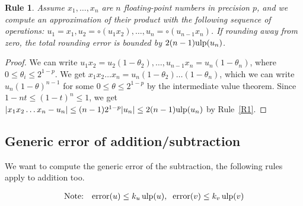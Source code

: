 \documentclass[12pt]{amsart}
\def\ulp{{\rm ulp}}
\DeclareMathOperator{\error}{error}
\newtheorem{Rule}{Rule}
\begin{document}
\begin{Rule} \label{R11}
Assume $x_1, \ldots, x_n$ are $n$ floating-point numbers in precision $p$,
and we compute an approximation of their product with the following sequence
of operations: $u_1 = x_1, u_2 = \circ(u_1 x_2), \ldots, u_n = \circ(u_{n-1}
x_n)$. If rounding away from zero, the total rounding error is bounded by
$2(n-1) \ulp(u_n)$.
\end{Rule}
\begin{proof}
We can write $u_1 x_2 = u_2 (1 - \theta_2), \ldots, u_{n-1} x_n = u_n
(1 - \theta_n)$, where $0 \leq \theta_i \leq 2^{1-p}$.
We get $x_1 x_2 \ldots x_n = u_n (1 - \theta_2) \ldots (1 - \theta_n)$,
which we can write $u_n (1-\theta)^{n-1}$ for some $0 \leq \theta \leq 2^{1-p}$
by the intermediate value theorem.
Since $1-nt \leq (1-t)^n \leq 1$, we get $|x_1 x_2 \ldots x_n - u_n| \leq
(n-1) 2^{1-p} |u_n| \leq 2 (n-1) \ulp(u_n)$ by Rule~\ref{R1}.
\end{proof}


\subsection{Generic error of addition/subtraction}\label{generic:sous}

We want to compute the generic error of the subtraction, the following rules
apply to addition too.

\begin{eqnarray}\nonumber
\textnormal{Note:}&& \error(u) \leq k_u \, \ulp(u), \;\; \error(v) \leq k_v \, \ulp(v)
\end{eqnarray}
\end{document}
